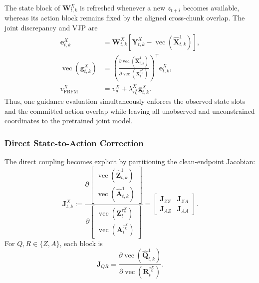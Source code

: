 The state block of $\mathbf W_{t,k}^X$ is refreshed whenever a new
$z_{t+i}$ becomes available, whereas its action block remains fixed by the aligned
cross-chunk overlap. The joint discrepancy and VJP are
\begin{align}
    \mathbf e_{t,k}^X
    &=
    \mathbf W_{t,k}^X
    \left[
        \mathbf Y_{t,k}^X
        -
        \operatorname{vec}(\hat{\mathbf X}_{t,k}^1)
    \right],
    \label{eq:joint-feedback-error}\\
    \operatorname{vec}(\mathbf g_{t,k}^X)
    &=
    \left(
        \frac{\partial\operatorname{vec}(\hat{\mathbf X}_{t,k}^1)}
             {\partial\operatorname{vec}(\mathbf X_t^{\tau_k^X})}
    \right)^{\mathsf T}
    \mathbf e_{t,k}^X,
    \label{eq:joint-feedback-vjp}\\
    v_{\mathrm{FBFM}}^X
    &=
    v_\theta^X
    +
    \lambda_{\tau_k^X}^X\mathbf g_{t,k}^X.
    \label{eq:guided-joint-flow}
\end{align}
Thus, one guidance evaluation simultaneously enforces the observed state slots and
the committed action overlap while leaving all unobserved and unconstrained
coordinates to the pretrained joint model.

\subsubsection{Direct State-to-Action Correction}

The direct coupling becomes explicit by partitioning the clean-endpoint Jacobian:
\begin{equation}
    \mathbf J_{t,k}^X
    :=
    \frac{\partial
        \begin{bmatrix}
            \operatorname{vec}(\hat{\mathbf Z}_{t,k}^1)\\
            \operatorname{vec}(\hat{\mathbf A}_{t,k}^1)
        \end{bmatrix}}
        {\partial
        \begin{bmatrix}
            \operatorname{vec}(\mathbf Z_t^{\tau_k^X})\\
            \operatorname{vec}(\mathbf A_t^{\tau_k^X})
        \end{bmatrix}}
    =
    \begin{bmatrix}
        \mathbf J_{ZZ} & \mathbf J_{ZA}\\
        \mathbf J_{AZ} & \mathbf J_{AA}
    \end{bmatrix}.
    \label{eq:joint-jacobian-blocks}
\end{equation}
For $Q,R\in\{Z,A\}$, each block is
\begin{equation}
    \mathbf J_{QR}
    =
    \frac{\partial\operatorname{vec}(\hat{\mathbf Q}_{t,k}^1)}
         {\partial\operatorname{vec}(\mathbf R_t^{\tau_k^X})}.
    \label{eq:cross-modal-jacobian-block}
\end{equation}

